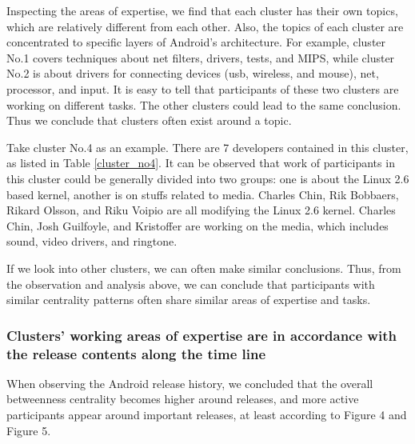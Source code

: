 \documentclass[10pt, conference, compsocconf]{IEEEtran}
\begin{document}
Inspecting the areas of expertise, we find that each cluster has their own
topics, which are relatively different from each other. Also, the topics of
each cluster are concentrated to specific layers of Android's architecture.
For example, cluster No.1 covers techniques about net filters,
drivers, tests, and MIPS, while cluster No.2 is about drivers for
connecting devices (usb, wireless, and mouse), net, processor, and
input. 
It is easy to tell that participants of these two clusters are
working on different tasks. 
The other clusters could lead to the same
conclusion. 
Thus we conclude that clusters often exist around a topic.


Take cluster No.4 as an example. There are 7 developers
contained in this cluster, as listed in Table \ref{cluster_no4}.
It can be observed that work of participants in this cluster
could be generally divided into two groups: one is about the Linux 2.6
based kernel, another is on stuffs related to media. Charles Chin, Rik
Bobbaers, Rikard Olsson, and Riku Voipio are all modifying the Linux 2.6
kernel. Charles Chin, Josh Guilfoyle, and Kristoffer are working on
the media, which includes sound, video drivers, and
ringtone. 

If we look into other clusters, we can often make similar conclusions.
Thus, from the observation and analysis above, we can conclude that
participants with similar centrality patterns often share similar
areas of expertise and tasks.

\subsubsection{Clusters' working areas of expertise are in accordance with the release contents along the time line}

When observing the Android release history, we concluded
that the overall betweenness centrality becomes higher around
releases, and more active participants appear around important
releases, at least according to Figure 4 and Figure 5.
\end{document}
